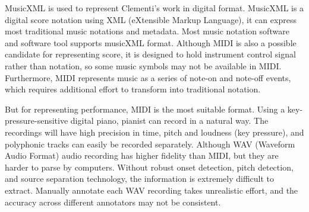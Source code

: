 MusicXML is used to represent Clementi's work in digital format.
MusicXML is a digital score notation using XML (eXtensible Markup Language), it can express most traditional music notations and metadata. Most music notation software and software tool supports musicXML format. %
%
Although MIDI is also a possible candidate for representing score, it is designed to hold instrument control signal rather than notation, so some music symbols may not be available in MIDI. Furthermore, MIDI represents music as a series of note-on and note-off events, which requires additional effort to transform into traditional notation.

But for representing performance, MIDI is the most suitable format. Using a key-pressure-sensitive digital piano, pianist can record in a natural way. The recordings will have high precision in time, pitch and loudness (key pressure), and polyphonic tracks can easily be recorded separately. Although WAV (Waveform Audio Format) audio recording has higher fidelity than MIDI, but they are harder to parse by computers. Without robust onset detection, pitch detection, and source separation technology, the information is extremely difficult to extract. Manually annotate each WAV recording takes unrealistic effort, and the accuracy across different annotators may not be consistent. 

